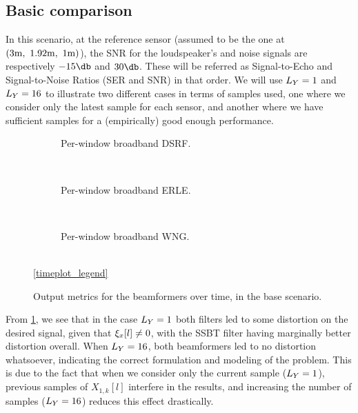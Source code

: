 \subsection{Basic comparison}
In this scenario, at the reference sensor (assumed to be the one at $(3\si{\meter},~1.92\si{\meter},~1\si{\meter})$), the SNR for the loudspeaker's and noise signals are respectively $-15\dB$ and $30\dB$. These will be referred as Signal-to-Echo and Signal-to-Noise Ratios (SER and SNR) in that order. We will use $\Ly = 1$ and $\Ly = 16$ to illustrate two different cases in terms of samples used, one where we consider only the latest sample for each sensor, and another where we have sufficient samples for a (empirically) good enough performance.


\begin{figure}[!ht]
	\centering
	\begin{subfigure}{\textwidth}
		\centering
		
		\caption{Per-window broadband DSRF.}
		\label{subfig:lineplot__DSRF_l__iSER_n15}
	\end{subfigure}\\[1em]
	\begin{subfigure}{\textwidth}
		\centering
		
		\caption{Per-window broadband ERLE.}
		\label{subfig:lineplot__ERLE_l__iSER_n15}
	\end{subfigure}\\[1em]
	\begin{subfigure}{\textwidth}
		\centering
		
		\caption{Per-window broadband WNG.}
		\label{subfig:lineplot__WNG_l__iSER_n15}
	\end{subfigure}\\[1em]
	\ref*{timeplot_legend}
	\caption{Output metrics for the beamformers over time, in the base scenario.}
	\label{fig:lineplot__iSER_n15__Ly_1}
\end{figure}


From \cref{subfig:lineplot__DSRF_l__iSER_n15}, we see that in the case $\Ly = 1$ both filters led to some distortion on the desired signal, given that $\xi_{x}[l] \neq 0$, with the SSBT filter having marginally better distortion overall. When $\Ly = 16$, both beamformers led to no distortion whatsoever, indicating the correct formulation and modeling of the problem. This is due to the fact that when we consider only the current sample ($\Ly = 1$), previous samples of $X_{1,k}[l]$ interfere in the results, and increasing the number of samples ($\Ly = 16$) reduces this effect drastically.

